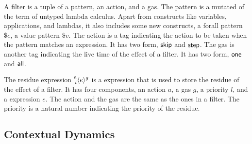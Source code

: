 A filter is a tuple of a pattern, an action, and a gas. The pattern
is a mutated of the term of untyped lambda calculus. Apart from constructs like
variables, applications, and lambdas, it also includes some new constructs, a
forall pattern \(\$e\), a value pattern \(\$v\). The action is a tag indicating
the action to be taken when the pattern matches an expression. It has two
form, \(\ActSkip\) and \(\ActStep\). The gas is another tag indicating the
live time of the effect of a filter. It has two form, \(\GasOne\) and
\(\GasAll\).

The residue expression \(\Residue{a}{g}{l}{e}\) is a expression that is used to
store the residue of the effect of a filter. It has four components, an action
\(a\), a gas \(g\), a priority \(l\), and a expression \(e\). The action and the
gas are the same as the ones in a filter. The priority is a natural number
indicating the priority of the residue.












\subsection{Contextual Dynamics}


